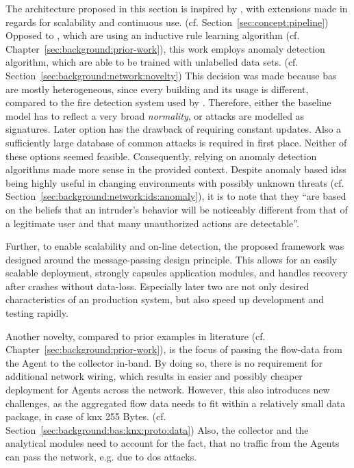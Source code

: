 The architecture proposed in this section is inspired by \textcite{Pan2014}, with extensions made in regards for scalability and continuous use. (cf. Section~\ref{sec:concept:pipeline})
Opposed to \textcite{Pan2014}, which are using an inductive rule learning algorithm (cf. Chapter~\ref{sec:background:prior-work}), this work employs anomaly detection algorithm, which are able to be trained with unlabelled data sets. (cf. Section~\ref{sec:background:network:novelty})
This decision was made because \gls{bas} are mostly heterogeneous, since every building and its usage is different, compared to the fire detection system used by \textcite{Pan2014}.
Therefore, either the baseline model has to reflect a very broad \emph{normality}, or attacks are modelled as signatures. Later option has the drawback of requiring constant updates. Also a sufficiently large database of common attacks is required in first place.
Neither of these options seemed feasible.
Consequently, relying on anomaly detection algorithms made more sense in the provided context.
Despite anomaly based \glspl{ids} being highly useful in changing environments with possibly unknown threats (cf. Section~\ref{sec:background:network:ids:anomaly}), it is to note that they \enquote{are based on the beliefs that an intruder's behavior will be noticeably different from that of a legitimate user and that many unauthorized actions are detectable}. \parencite{Mukherjee1994,Yang2006}

Further, to enable scalability and on-line detection, the proposed framework was designed around the message-passing design principle.
This allows for an easily scalable deployment, strongly capsules application modules, and handles recovery after crashes without data-loss.
Especially later two are not only desired characteristics of an production system, but also speed up development and testing rapidly.

Another novelty, compared to prior examples in literature (cf. Chapter~\ref{sec:background:prior-work}), is the focus of passing the flow-data from the Agent to the collector in-band. By doing so, there is no requirement for additional network wiring, which results in easier and possibly cheaper deployment for Agents across the network.
However, this also introduces new challenges, as the aggregated flow data needs to fit within a relatively small data package, in case of \gls{knx} 255 Bytes. (cf. Section~\ref{sec:background:bas:knx:proto:data})
Also, the collector and the analytical modules need to account for the fact, that no traffic from the Agents can pass the network, e.g. due to \gls{dos} attacks.

